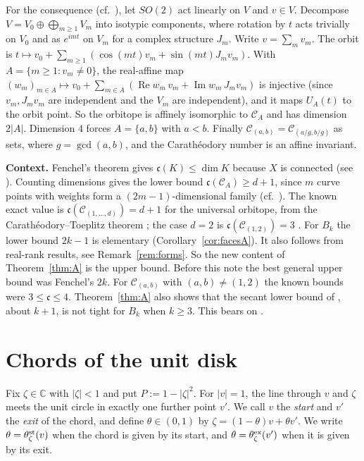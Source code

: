 \documentclass[11pt]{amsart}
\theoremstyle{remark}
\newcommand{\C}{\mathbb{C}}
\newcommand{\cc}{\mathfrak{c}}
\begin{document}
For the consequence (cf.\ \cite[Example 2.1, Lemma 5.1]{SSS}), let $SO(2)$ act linearly on $V$ and $v\in V$. Decompose $V=V_0\oplus\bigoplus_{m\ge1}V_m$ into isotypic
components, where rotation by $t$ acts trivially on $V_0$ and as $e^{imt}$ on $V_m$ for a complex structure $J_m$. Write $v=\sum_mv_m$. The orbit is
$t\mapsto v_0+\sum_{m\ge1}(\cos(mt)v_m+\sin(mt)J_mv_m)$. With $A=\{m\ge1:v_m\ne0\}$, the real-affine map $(w_m)_{m\in A}\mapsto
v_0+\sum_{m\in A}(\operatorname{Re}w_m\,v_m+\operatorname{Im}w_m\,J_mv_m)$ is injective (since $v_m,J_mv_m$ are independent and the $V_m$ are independent), and it maps $U_A(t)$ to the
orbit point. So the orbitope is affinely isomorphic to $\mathcal C_A$ and has dimension $2|A|$. Dimension $4$ forces $A=\{a,b\}$ with $a<b$. Finally
$\mathcal C_{(a,b)}=\mathcal C_{(a/g,b/g)}$ as sets, where $g=\gcd(a,b)$, and the Carath\'eodory number is an affine invariant.

\smallskip\noindent\textbf{Context.} Fenchel's theorem \cite{Fen} gives $\cc(K)\le\dim K$ because $X$ is connected (see \cite[\S2.1]{SSS}). Counting dimensions gives the lower bound
$\cc(\mathcal C_A)\ge d+1$, since $m$ curve points with weights form a $(2m-1)$-dimensional family (cf.\ \cite[Prop.~2.3]{SSS}). The known exact value is
$\cc(\mathcal C_{(1,\dots,d)})=d+1$ for the universal orbitope, from the Carath\'eodory--Toeplitz theorem \cite{Car,SSS}; the case $d=2$ is $\cc(\mathcal C_{(1,2)})=3$
\cite[Example 1.1]{SSS}. For $B_k$ the lower bound $2k-1$ is elementary (Corollary~\ref{cor:facesA}). It also follows from real-rank results, see
Remark~\ref{rem:forms}. So the new content of Theorem~\ref{thm:A} is the upper bound. Before this note the best general upper bound was Fenchel's $2k$. For
$\mathcal C_{(a,b)}$ with $(a,b)\ne(1,2)$ the known bounds were $3\le\cc\le4$. Theorem~\ref{thm:A} also shows that the secant lower bound of
\cite[Prop.~2.3]{SSS}, about $k+1$, is not tight for $B_k$ when $k\ge3$. This bears on \cite[Question~7]{SSS}.

\section{Chords of the unit disk}

Fix $\zeta\in\C$ with $|\zeta|<1$ and put $P:=1-|\zeta|^2$. For $|v|=1$, the line through $v$ and $\zeta$ meets the unit circle in exactly one further
point $v'$. We call $v$ the \emph{start} and $v'$ the \emph{exit} of the chord, and define $\theta\in(0,1)$ by $\zeta=(1-\theta)v+\theta v'$.
We write $\theta=\theta^{\rm st}_\zeta(v)$ when the chord is given by its start, and $\theta=\theta^{\rm ex}_\zeta(v')$ when it is given by its exit.
\end{document}
